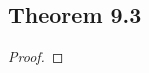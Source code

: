 \documentclass[../../main.tex]{subfiles}
\begin{document}
\subsection{Theorem 9.3}
\begin{wts}

\end{wts}
\begin{proof}

\end{proof}
\end{document}
